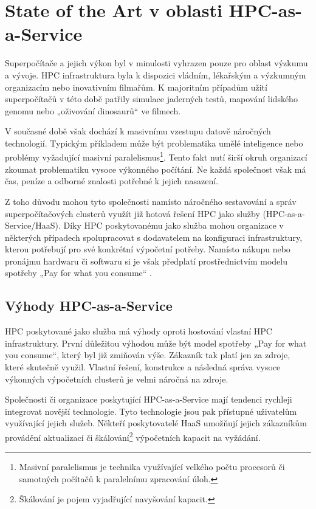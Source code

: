 \chapter{State of the Art v oblasti HPC-as-a-Service}
Superpočítače a jejich výkon byl v minulosti vyhrazen pouze pro oblast výzkumu a vývoje. HPC infrastruktura byla k dispozici vládním, lékařským a výzkumným organizacím nebo inovativním filmařům. K majoritním případům užití superpočítačů v této době patřily simulace jaderných testů, mapování lidského genomu nebo „oživování dinosaurů“ ve filmech.

V současné době však dochází k masivnímu vzestupu datově náročných technologií. Typickým příkladem může být problematika umělé inteligence nebo problémy vyžadující masivní paralelismus\footnote{Masivní paralelismus je technika využívající velkého počtu procesorů či samotných počítačů k paralelnímu zpracování úloh.}. Tento fakt nutí širší okruh organizací zkoumat problematiku vysoce výkonného počítání. Ne každá společnost však má čas, peníze a odborné znalosti potřebné k jejich nasazení.

Z toho důvodu mohou tyto společnosti namísto náročného sestavování a správ superpočítačových clusterů využít již hotová řešení HPC jako služby (HPC-as-a-Service/HaaS). Díky HPC poskytovanému jako služba mohou organizace v některých případech spolupracovat s dodavatelem na konfiguraci infrastruktury, kterou potřebují pro své konkrétní výpočetní potřeby. Namísto nákupu nebo pronájmu hardwaru či softwaru si je však předplatí prostřednictvím modelu spotřeby „Pay for what you consume“ \cite{Rand20201203}.

\section{Výhody HPC-as-a-Service}
HPC poskytované jako služba má výhody oproti hostování vlastní HPC infrastruktury. První důležitou výhodou může být model spotřeby „Pay for what you consume“, který byl již zmiňován výše. Zákazník tak platí jen za zdroje, které skutečně využil. Vlastní řešení, konstrukce a následná správa vysoce výkonných výpočetních clusterů je velmi náročná na zdroje.

Společnosti či organizace poskytující HPC-as-a-Service mají tendenci rychleji integrovat novější technologie. Tyto technologie jsou pak přístupné uživatelům využívající jejich služeb. Někteří poskytovatelé HaaS umožňují jejich zákazníkům provádění aktualizací či škálování\footnote{Škálování je pojem vyjadřující navyšování kapacit.} výpočetních kapacit na vyžádání. \cite{Wiggers20220120}

